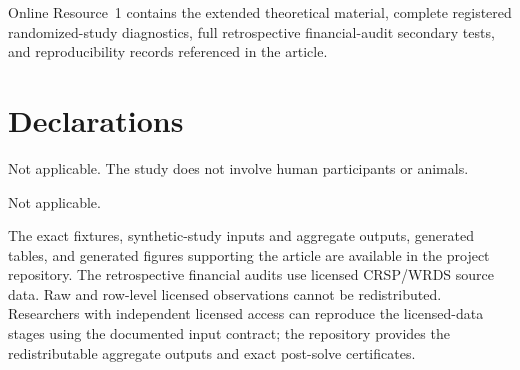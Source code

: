 \documentclass[pdflatex,sn-mathphys-ay]{sn-jnl}
\numberwithin{equation}{section}
\theoremstyle{aor-definition}
\theoremstyle{aor-theorem}
\begin{document}













\appendix









\backmatter

Online Resource~1 contains the extended theoretical material, complete
registered randomized-study diagnostics, full retrospective financial-audit
secondary tests, and reproducibility records referenced in the article.

\section*{Declarations}

\AORFundingStatement

\AORCompetingInterestsStatement

Not applicable. The study does not involve human participants or animals.

Not applicable.

The exact fixtures, synthetic-study inputs and aggregate outputs, generated
tables, and generated figures supporting the article are available in the
project repository. The retrospective financial audits use licensed
CRSP/WRDS source data. Raw and row-level licensed observations cannot be
redistributed. Researchers with independent licensed access can reproduce the
licensed-data stages using the documented input contract; the repository
provides the redistributable aggregate outputs and exact post-solve
certificates.
\end{document}

